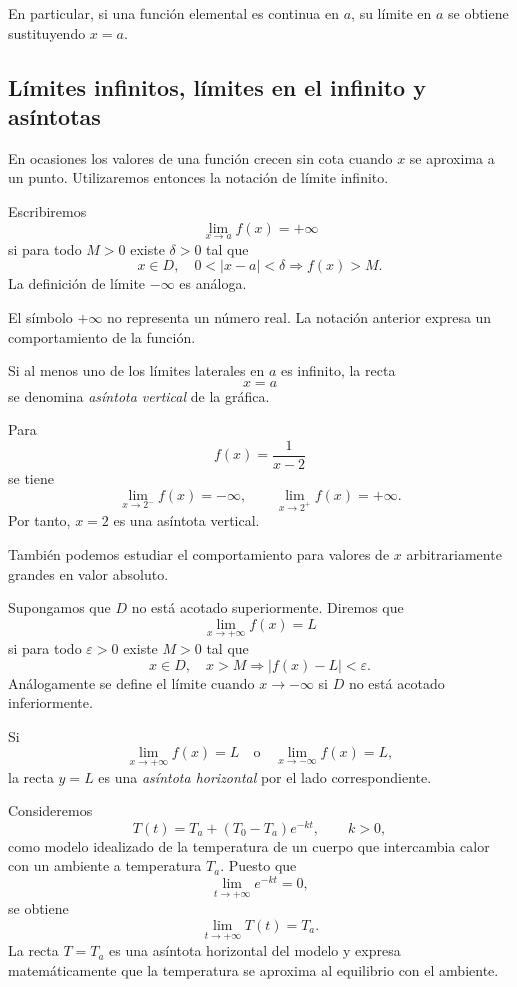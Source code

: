 En particular, si una función elemental es continua en $a$, su límite en $a$ se obtiene sustituyendo $x=a$.

\subsection{Límites infinitos, límites en el infinito y asíntotas}

En ocasiones los valores de una función crecen sin cota cuando $x$ se aproxima a un punto. Utilizaremos entonces la notación de límite infinito.

\begin{definition}
Escribiremos
\[
\lim_{x\to a}f(x)=+\infty
\]
si para todo $M>0$ existe $\delta>0$ tal que
\[
x\in D,\quad 0<|x-a|<\delta\Longrightarrow f(x)>M.
\]
La definición de límite $-\infty$ es análoga.
\end{definition}

El símbolo $+\infty$ no representa un número real. La notación anterior expresa un comportamiento de la función.

Si al menos uno de los límites laterales en $a$ es infinito, la recta
\[
x=a
\]
se denomina \emph{asíntota vertical} de la gráfica.

\begin{example}
Para
\[
f(x)=\frac{1}{x-2}
\]
se tiene
\[
\lim_{x\to2^-}f(x)=-\infty,
\qquad
\lim_{x\to2^+}f(x)=+\infty.
\]
Por tanto, $x=2$ es una asíntota vertical.
\end{example}

También podemos estudiar el comportamiento para valores de $x$ arbitrariamente grandes en valor absoluto.

\begin{definition}
Supongamos que $D$ no está acotado superiormente. Diremos que
\[
\lim_{x\to+\infty}f(x)=L
\]
si para todo $\varepsilon>0$ existe $M>0$ tal que
\[
x\in D,\quad x>M\Longrightarrow |f(x)-L|<\varepsilon.
\]
Análogamente se define el límite cuando $x\to-\infty$ si $D$ no está acotado inferiormente.
\end{definition}

Si
\[
\lim_{x\to+\infty}f(x)=L
\quad\text{o}\quad
\lim_{x\to-\infty}f(x)=L,
\]
la recta $y=L$ es una \emph{asíntota horizontal} por el lado correspondiente.

\begin{example}
Consideremos
\[
T(t)=T_a+(T_0-T_a)e^{-kt},\qquad k>0,
\]
como modelo idealizado de la temperatura de un cuerpo que intercambia calor con un ambiente a temperatura $T_a$. Puesto que
\[
\lim_{t\to+\infty}e^{-kt}=0,
\]
se obtiene
\[
\lim_{t\to+\infty}T(t)=T_a.
\]
La recta $T=T_a$ es una asíntota horizontal del modelo y expresa matemáticamente que la temperatura se aproxima al equilibrio con el ambiente.
\end{example}

